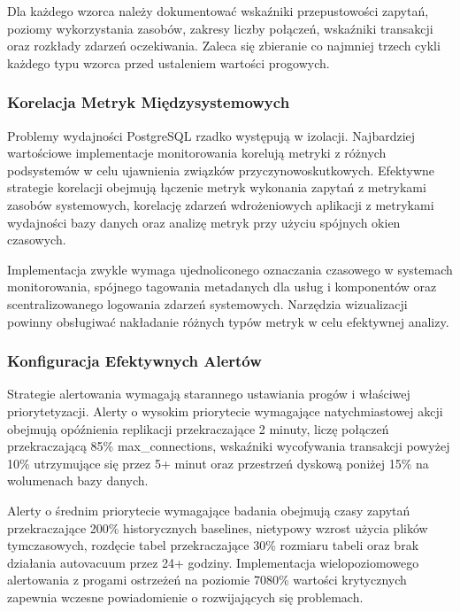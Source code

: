 \documentclass[a4paper,11pt,openany,english]{sphinxmanual}
\begin{document}
\sphinxAtStartPar
Dla każdego wzorca należy dokumentować wskaźniki przepustowości zapytań, poziomy wykorzystania zasobów, zakresy liczby połączeń, wskaźniki transakcji oraz rozkłady zdarzeń oczekiwania. Zaleca się zbieranie co najmniej trzech cykli każdego typu wzorca przed ustaleniem wartości progowych.


\subsubsection{Korelacja Metryk Międzysystemowych}
\label{\detokenize{rozdzial2/Monitorowanie-i-diagnostyka/index:korelacja-metryk-miedzysystemowych}}
\sphinxAtStartPar
Problemy wydajności PostgreSQL rzadko występują w izolacji. Najbardziej wartościowe implementacje monitorowania korelują metryki z różnych podsystemów w celu ujawnienia związków przyczynowo\sphinxhyphen{}skutkowych. Efektywne strategie korelacji obejmują łączenie metryk wykonania zapytań z metrykami zasobów systemowych, korelację zdarzeń wdrożeniowych aplikacji z metrykami wydajności bazy danych oraz analizę metryk przy użyciu spójnych okien czasowych.

\sphinxAtStartPar
Implementacja zwykle wymaga ujednoliconego oznaczania czasowego w systemach monitorowania, spójnego tagowania metadanych dla usług i komponentów oraz scentralizowanego logowania zdarzeń systemowych. Narzędzia wizualizacji powinny obsługiwać nakładanie różnych typów metryk w celu efektywnej analizy.


\subsubsection{Konfiguracja Efektywnych Alertów}
\label{\detokenize{rozdzial2/Monitorowanie-i-diagnostyka/index:konfiguracja-efektywnych-alertow}}
\sphinxAtStartPar
Strategie alertowania wymagają starannego ustawiania progów i właściwej priorytetyzacji. Alerty o wysokim priorytecie wymagające natychmiastowej akcji obejmują opóźnienia replikacji przekraczające 2 minuty, liczę połączeń przekraczającą 85\% max\_connections, wskaźniki wycofywania transakcji powyżej 10\% utrzymujące się przez 5+ minut oraz przestrzeń dyskową poniżej 15\% na wolumenach bazy danych.

\sphinxAtStartPar
Alerty o średnim priorytecie wymagające badania obejmują czasy zapytań przekraczające 200\% historycznych baselines, nietypowy wzrost użycia plików tymczasowych, rozdęcie tabel przekraczające 30\% rozmiaru tabeli oraz brak działania autovacuum przez 24+ godziny. Implementacja wielopoziomowego alertowania z progami ostrzeżeń na poziomie 70\sphinxhyphen{}80\% wartości krytycznych zapewnia wczesne powiadomienie o rozwijających się problemach.
\end{document}
